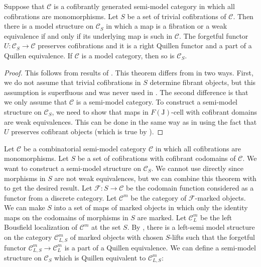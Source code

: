 \documentclass[reqno]{amsart}
\theoremstyle{definition}
\theoremstyle{remark}
\newcommand{\fs}[1]{\mathrm{#1}}
\newcommand{\cat}[1]{\mathcal{#1}}
\newcommand{\C}{\cat{C}}
\newcommand{\I}{\fs{I}}
\newcommand{\J}{\fs{J}}
\newcommand{\class}[2]{#1\text{-}\mathrm{#2}}
\newcommand{\Icell}[1][\I]{\class{#1}{cell}}
\numberwithin{figure}{section}
\begin{document}
\begin{thm}
Suppose that $\C$ is a cofibrantly generated semi-model category in which all cofibrations are monomorphisms.
Let $S$ be a set of trivial cofibrations of $\C$.
Then there is a model structure on $\C_S$ in which a map is a fibration or a weak equivalence if and only if its underlying map is such in $\C$.
The forgetful functor $U : \C_S \to \C$ preserves cofibrations and it is a right Quillen functor and a part of a Quillen equivalence.
If $\C$ is a model category, then so is $\C_S$.
\end{thm}
\begin{proof}
This follows from results of \cite{algebraic-fibrant-objects}.
This theorem differs from \cite[Theorem~2.20]{algebraic-fibrant-objects} in two ways.
First, we do not assume that trivial cofibrations in $S$ determine fibrant objects, but this assumption is superfluous and was never used in \cite{algebraic-fibrant-objects}.
The second difference is that we only assume that $\C$ is a semi-model category.
To construct a semi-model structure on $\C_S$, we need to show that maps in $\Icell[F(\J)]$ with cofibrant domains are weak equivalences.
This can be done in the same way as in \cite[Theorem~2.20]{algebraic-fibrant-objects} using the fact that $U$ preserves cofibrant objects (which is true by \cite[Corollary~2.18]{algebraic-fibrant-objects}).
\end{proof}

Let $\C$ be a combinatorial semi-model category $\C$ in which all cofibrations are monomorphisms.
Let $S$ be a set of cofibrations with cofibrant codomains of $\C$.
We want to construct a semi-model structure on $\C_S$.
We cannot use  directly since morphisms in $S$ are not weak equivalences, but we can combine this theorem with  to get the desired result.
Let $\mathcal{F} : S \to \C$ be the codomain function considered as a functor from a discrete category.
Let $\C^m$ be the category of $\mathcal{F}$-marked objects.
We can make $S$ into a set of maps of marked objects in which only the identity maps on the codomains of morphisms in $S$ are marked.
Let $\C^m_L$ be the left Bousfield localization of $\C^m$ at the set $S$.
By , there is a left-semi model structure on the category $\C^m_{L,S}$ of marked objects with chosen $S$-lifts such that the forgetful functor $\C^m_{L,S} \to \C^m_L$ is a part of a Quillen equivalence.
We can define a semi-model structure on $\C_S$ which is Quillen equivalent to $\C^m_{L,S}$:
\end{document}
